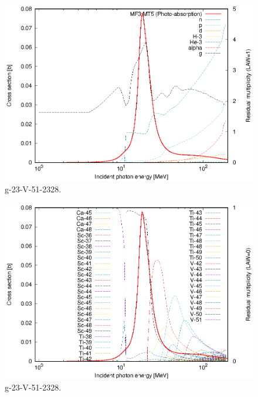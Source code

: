 \begin{figure}
 \includegraphics[width=\linewidth]{eps/g_23-V-51_2328.eps}
  \caption{g-23-V-51-2328.}
\end{figure}
\begin{figure}
 \includegraphics[width=\linewidth]{eps-law0/g_23-V-51_2328.eps}
 \caption{g-23-V-51-2328.}
\end{figure}
\newpage \clearpage

